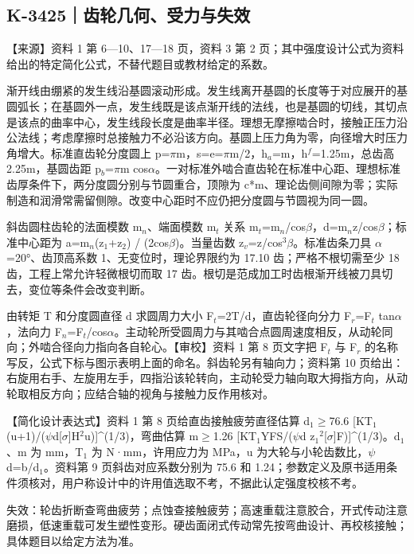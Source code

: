 \documentclass[zihao=5,a4paper,UTF8,fontset=fandol]{ctexart}
\begin{document}
\subsection{K-3425｜齿轮几何、受力与失效}
\label{k-3425}

【来源】资料 1 第 6—10、17—18 页，资料 3 第 2 页；其中强度设计公式为资料给出的特定简化公式，不替代题目或教材给定的系数。


渐开线由绷紧的发生线沿基圆滚动形成。发生线离开基圆的长度等于对应展开的基圆弧长；在基圆外一点，发生线既是该点渐开线的法线，也是基圆的切线，其切点是该点的曲率中心，发生线段长度是曲率半径。理想无摩擦啮合时，接触正压力沿公法线；考虑摩擦时总接触力不必沿该方向。基圆上压力角为零，向径增大时压力角增大。标准直齿轮分度圆上 p=$\pi$m，s=e=$\pi$m/2，h$_{a}$=m，h$^{f}$=1.25m，总齿高 2.25m，基圆齿距 p$_{b}$=$\pi$m cos$\alpha$。一对标准外啮合直齿轮在标准中心距、理想标准齿厚条件下，两分度圆分别与节圆重合，顶隙为 c*m、理论齿侧间隙为零；实际制造和润滑常需留侧隙。改变中心距时不应仍把分度圆与节圆视为同一圆。


斜齿圆柱齿轮的法面模数 m$_{n}$、端面模数 m$_{t}$ 关系 m$_{t}$=m$_{n}$/cos$\beta$，d=m$_{n}$z/cos$\beta$；标准中心距为 a=m$_{n}$(z$_{1}$+z$_{2}$) / (2cos$\beta$)。当量齿数 z$_{v}$=z/cos$^{3}$$\beta$。标准齿条刀具 $\alpha$=20°、齿顶高系数 1、无变位时，理论界限约为 17.10 齿；严格不根切需至少 18 齿，工程上常允许轻微根切而取 17 齿。根切是范成加工时齿根渐开线被刀具切去，变位等条件会改变判断。


由转矩 T 和分度圆直径 d 求圆周力大小 F$_{t}$=2T/d，直齿轮径向分力 F$_{r}$=F$_{t}$ tan$\alpha$，法向力 F$_{n}$=F$_{t}$/cos$\alpha$。主动轮所受圆周力与其啮合点圆周速度相反，从动轮同向；外啮合径向力指向各自轮心。【审校】资料 1 第 8 页文字把 F$_{t}$ 与 F$_{r}$ 的名称写反，公式下标与图示表明上面的命名。斜齿轮另有轴向力；资料第 10 页给出：右旋用右手、左旋用左手，四指沿该轮转向，主动轮受力轴向取大拇指方向，从动轮取相反方向；应结合轴的视角与接触力反作用核对。


【简化设计表达式】资料 1 第 8 页给直齿接触疲劳直径估算 d$_{1}$$\ge$76.6 [KT$_{1}$(u+1)/($\psi$d[$\sigma$]H$^{2}$u)]\textasciicircum{}(1/3)，弯曲估算 m$\ge$1.26 [KT$_{1}$YFS/($\psi$d z$_{1}$$^{2}$[$\sigma$]F)]\textasciicircum{}(1/3)。d$_{1}$、m 为 mm，T$_{1}$ 为 N·mm，许用应力为 MPa，u 为大轮与小轮齿数比，$\psi$d=b/d$_{1}$。资料第 9 页斜齿对应系数分别为 75.6 和 1.24；参数定义及原书适用条件须核对，用户称设计中的许用值选取不考，不据此认定强度校核不考。


失效：轮齿折断查弯曲疲劳；点蚀查接触疲劳；高速重载注意胶合，开式传动注意磨损，低速重载可发生塑性变形。硬齿面闭式传动常先按弯曲设计、再校核接触；具体题目以给定方法为准。
\end{document}
